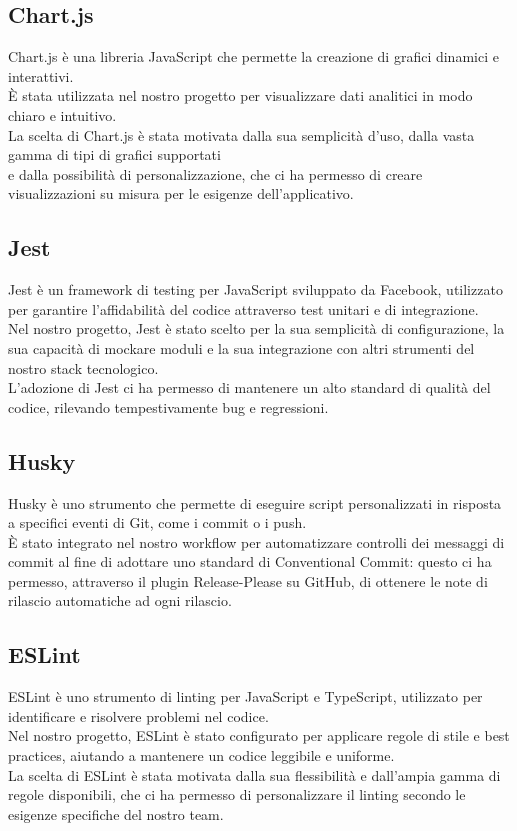\subsection{Chart.js}
Chart.js\cite{chart} è una libreria JavaScript che permette la creazione di grafici dinamici e interattivi.\\
È stata utilizzata nel nostro progetto per visualizzare dati analitici in modo chiaro e intuitivo.\\
La scelta di Chart.js è stata motivata dalla sua semplicità d'uso, dalla vasta gamma di tipi di grafici supportati\\
e dalla possibilità di personalizzazione, che ci ha permesso di creare visualizzazioni su misura per le esigenze dell'applicativo.

\subsection{Jest}
Jest\cite{jest} è un framework di testing per JavaScript sviluppato da Facebook, utilizzato per garantire l'affidabilità del
codice attraverso test unitari e di integrazione.\\
Nel nostro progetto, Jest è stato scelto per la sua semplicità di configurazione, la sua capacità
di mockare moduli e la sua integrazione con altri strumenti del nostro stack tecnologico.\\
L'adozione di Jest ci ha permesso di mantenere un alto standard di qualità del codice, rilevando tempestivamente bug e regressioni.

\subsection{Husky}
Husky\cite{husky} è uno strumento che permette di eseguire script personalizzati in risposta a specifici eventi di Git,
come i commit o i push.\\ È stato integrato nel nostro workflow per automatizzare controlli dei messaggi di commit
al fine di adottare uno standard di Conventional Commit: questo ci ha permesso, attraverso il plugin Release-Please su GitHub, di ottenere le note di rilascio automatiche ad ogni rilascio.

\subsection{ESLint}
ESLint\cite{eslint} è uno strumento di linting per JavaScript e TypeScript, utilizzato per identificare e risolvere problemi nel codice.\\
Nel nostro progetto, ESLint è stato configurato per applicare regole di stile e best practices, aiutando a mantenere un
codice leggibile e uniforme.\\ La scelta di ESLint è stata motivata dalla sua flessibilità e dall'ampia gamma di regole
disponibili, che ci ha permesso di personalizzare il linting secondo le esigenze specifiche del nostro team.

